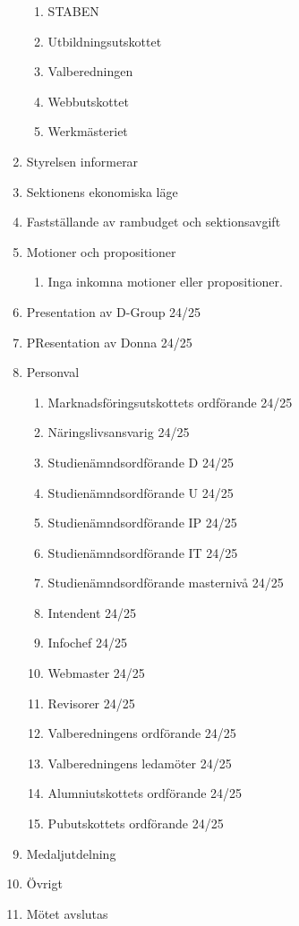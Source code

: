 \documentclass{datateknologsektionen-document}
\begin{document}
\begin{enumerate}[topsep=0pt,itemsep=1ex]
\begin{enumerate}[label*=\arabic*.,leftmargin=3em]
          \item STABEN
          \item Utbildningsutskottet
          \item Valberedningen
          \item Webbutskottet
          \item Werkmästeriet
        \end{enumerate}
  \item Styrelsen informerar
  \item Sektionens ekonomiska läge
  \item Fastställande av rambudget och sektionsavgift
  \item Motioner och propositioner
        \begin{enumerate}[label*=\arabic*.,leftmargin=3em]
          \item Inga inkomna motioner eller propositioner.
        \end{enumerate}
  \item Presentation av D-Group 24/25
  \item PResentation av Donna 24/25
  \item Personval
        \begin{enumerate}[label*=\arabic*.,leftmargin=3em]
          \item Marknadsföringsutskottets ordförande 24/25
          \item Näringslivsansvarig 24/25
          \item Studienämndsordförande D 24/25
          \item Studienämndsordförande U 24/25
          \item Studienämndsordförande IP 24/25
          \item Studienämndsordförande IT 24/25
          \item Studienämndsordförande masternivå 24/25
          \item Intendent 24/25
          \item Infochef 24/25
          \item Webmaster 24/25
          \item Revisorer 24/25
          \item Valberedningens ordförande 24/25
          \item Valberedningens ledamöter 24/25
          \item Alumniutskottets ordförande 24/25
          \item Pubutskottets ordförande 24/25
        \end{enumerate}
  \item Medaljutdelning
  \item Övrigt
  \item Mötet avslutas
\end{enumerate}
\end{document}
